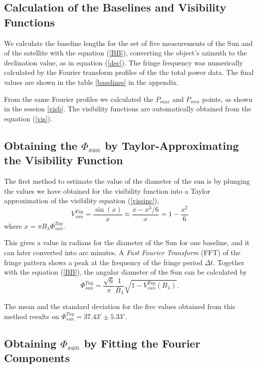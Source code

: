 \bigskip
\subsection{Calculation of the  Baselines  and Visibility Functions}
We calculate the baseline lengths for the set of five measurements of the Sun and of the satellite with the equation (\ref{BB}), converting the object's azimuth to the declination value, as in equation (\ref{dec}). The fringe frequency was numerically calculated by the Fourier transform profiles of the the total power data. The final values are shown in the table \ref{baselines} in the appendix.

From the same Fourier profiles we calculated the $P_{max}$ and $P_{min}$ points, as shown in the session \ref{visb}. The visibility functions are automatically obtained from the equation (\ref{vis}). 





\bigskip
\subsection{Obtaining the $\Phi_{sun}$ by Taylor-Approximating the Visibility Function} \label{taylormet}

The first method to estimate the value of the diameter of the sun is by plunging the values we have obtained for the visibility function into a Taylor approximation of the visibility equation (\ref{vissinc}),
$$ V_{sun}^{Tay}  = \frac{\sin(x)}{x} \approx \frac{x-x^3/6}{x} = 1 - \frac{x^2}{6}$$
where $x=\pi B_{\lambda} \Phi^{Tay}_{sun} $.

This gives  a value in radians for the  diameter of the Sun for one baseline, and it can later converted into arc minutes. A {\it Fast Fourier Transform} (FFT) of the fringe pattern shows a peak at the frequency of the fringe period $\Delta t$. Together with the equation (\ref{BB}), the angular diameter of the Sun can be calculated by
\begin{equation}
\Phi_{sun}^{Tay} = \frac{\sqrt{6}}{\pi} \frac{1}{B_{\lambda}} \sqrt{1 - V_{sun}^{Tay}(B_{\lambda})}.
\label{vistay}
\end{equation}

The mean and the standard deviation  for the five values obtained from this method results on $\Phi^{Tay}_{sun} = 37.43' \pm 5.33'$.



\bigskip

\subsection{Obtaining $\Phi_{sun}$ by Fitting the Fourier Components} \label{fitmet}


